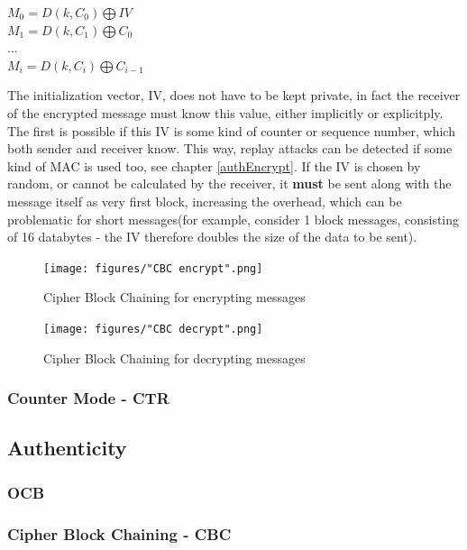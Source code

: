 \begin{center}
$ M_0 = D(k, C_0) \bigoplus IV $
\\
$ M_1 = D(k, C_1) \bigoplus C_0 $
\\
$...$
\\
$ M_i = D(k, C_i) \bigoplus C_{i-1} $
\end{center}

The initialization vector, IV, does not have to be kept private, in fact the receiver of the encrypted message must know this value,
either implicitly or explicitply. The first is possible if this IV is some kind of counter or sequence number, which both sender
and receiver know. This way, replay attacks can be detected if some kind of MAC is used too, see chapter \ref{authEncrypt}.
If the IV is chosen by random, or cannot be calculated by the receiver, it \textbf{must} be sent along with the message itself as
very first block, increasing the overhead, which can be problematic for short messages(for example, consider 1 block messages, consisting
of 16 databytes - the IV therefore doubles the size of the data to be sent).

\begin{figure}
    \centering
    \texttt{[image: figures/"CBC encrypt".png]}
    \caption{Cipher Block Chaining for encrypting messages}
    \label{fig:cbc_encrypt}
\end{figure}

\begin{figure}
    \centering
    \texttt{[image: figures/"CBC decrypt".png]}
    \caption{Cipher Block Chaining for decrypting messages}
    \label{fig:cbc_decrypt}
\end{figure}

\subsubsection{Counter Mode - CTR}

\subsection{Authenticity}\label{authenticity}

\subsubsection{OCB}

\subsubsection{Cipher Block Chaining - CBC}


